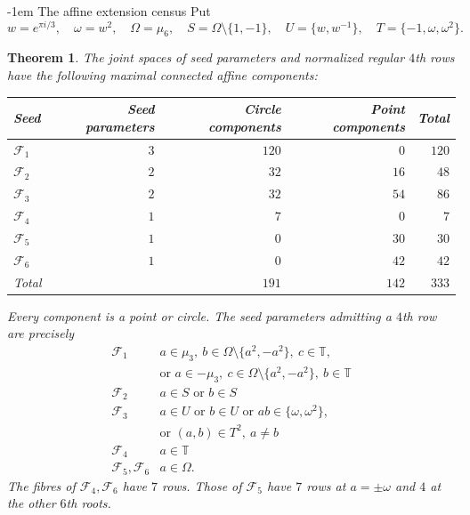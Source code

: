 \documentclass[11pt,a4paper]{article}
\makeatletter
\newtheorem{theorem}{Theorem}[section]
\theoremstyle{plain}
\theoremstyle{definition}
\numberwithin{equation}{section}
\renewcommand\subsection{\@startsection{subsection}{2}{\z@}  {\medskipamount}  {-1em}  {\normalfont\normalsize\bfseries}}
\makeatother
\begin{document}
\subsection{The affine extension census}\label{sec:affine4}\label{census:fibres}\label{census:verification}
Put
$$
w=e^{\pi i/3},\quad \omega=w^2,\quad
\Omega=\mu_6,\quad S=\Omega\setminus\{1,-1\},\quad
U=\{w,w^{-1}\},\quad T=\{-1,\omega,\omega^2\}.
$$
\begin{theorem}\label{census:complete}
The joint spaces of seed parameters and normalized regular $4$th rows have the following maximal connected affine components:
\begin{center}\begin{tabular}{@{}lrrrr@{}}\toprule
Seed & Seed parameters & Circle components & Point components & Total\\\midrule
$\mathcal{F}_1$&$3$&$120$&$0$&$120$\\
$\mathcal{F}_2$&$2$&$32$&$16$&$48$\\
$\mathcal{F}_3$&$2$&$32$&$54$&$86$\\
$\mathcal{F}_4$&$1$&$7$&$0$&$7$\\
$\mathcal{F}_5$&$1$&$0$&$30$&$30$\\
$\mathcal{F}_6$&$1$&$0$&$42$&$42$\\\midrule
Total&&$191$&$142$&$333$\\\bottomrule
\end{tabular}\end{center}
Every component is a point or circle. The seed parameters admitting a $4$th row are precisely
$$\begin{array}{c|l}
\mathcal F_1& a\in\mu_3,\ b\in\Omega\setminus\{a^2,-a^2\},\ c\in\mathbb T,\\
&\text{or }a\in-\mu_3,\ c\in\Omega\setminus\{a^2,-a^2\},\ b\in\mathbb T\\
\mathcal F_2&a\in S\text{ or }b\in S\\
\mathcal F_3&a\in U\text{ or }b\in U\text{ or }ab\in\{\omega,\omega^2\},\\
&\text{or }(a,b)\in T^2,\ a\ne b\\
\mathcal F_4&a\in\mathbb T\\
\mathcal F_5,\mathcal F_6&a\in\Omega.
\end{array}$$
The fibres of $\mathcal F_4,\mathcal F_6$ have $7$ rows. Those of $\mathcal F_5$ have $7$ rows at $a=\pm \omega$ and $4$ at the other $6$th roots.
\end{theorem}
\end{document}
